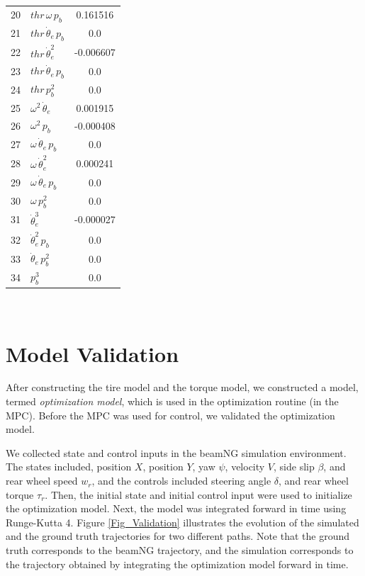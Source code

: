 \documentclass{article}
\begin{document}
\begin{table}[h!]
\begin{tabular}{clS[table-format=+5.6e+2]}
20 & $thr\,\omega\,p_b$                     & 0.161516 \\
21 & $thr\,\dot{\theta}_e\,p_b$             & 0.0 \\
22 & $thr\,\dot{\theta}_e^2$               & -0.006607 \\
23 & $thr\,\dot{\theta}_e\,p_b$             & 0.0 \\
24 & $thr\,p_b^2$                           & 0.0 \\
25 & $\omega^2\,\dot{\theta}_e$                & 0.001915 \\
26 & $\omega^2\,p_b$                           & -0.000408 \\
27 & $\omega\,\dot{\theta}_e\,p_b$             & 0.0 \\
28 & $\omega\,\dot{\theta}_e^2$               & 0.000241 \\
29 & $\omega\,\dot{\theta}_e\,p_b$             & 0.0 \\
30 & $\omega\,p_b^2$                           & 0.0 \\
31 & $\dot{\theta}_e^3$                        & -0.000027 \\
32 & $\dot{\theta}_e^2\,p_b$                   & 0.0 \\
33 & $\dot{\theta}_e\,p_b^2$                   & 0.0 \\
34 & $p_b^3$                                   & 0.0 \\
\bottomrule
\end{tabular}
\\[6pt]
\footnotesize
\end{table}

\newpage
\section{Model Validation}
After constructing the tire model and the torque model, we constructed a model, termed \textit{optimization model}, which is used in the optimization routine (in the MPC). Before the MPC was used for control, we validated the optimization model. 

We collected state and control inputs in the beamNG simulation environment. The states included, position $X$, position $Y$, yaw $\psi$, velocity $V$, side slip $\beta$, and rear wheel speed $w_r$, and the controls included steering angle $\delta$, and rear wheel torque $\tau_r$. Then, the initial state and initial control input were used to initialize the optimization model. Next, the model was integrated forward in time using Runge-Kutta 4. Figure \ref{Fig_Validation} illustrates the evolution of the simulated and the ground truth trajectories for two different paths. Note that the ground truth corresponds to the beamNG trajectory, and the simulation corresponds to the trajectory obtained by integrating the optimization model forward in time. 
\end{document}
